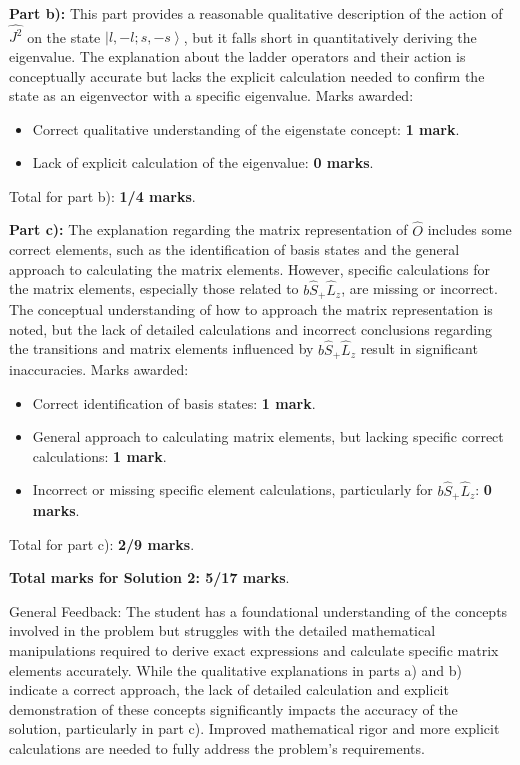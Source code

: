 \documentclass[a4paper,11pt]{article}
\begin{document}
\textbf{Part b):} This part provides a reasonable qualitative description of the action of \(\hat{J^{2}}\) on the state \(\left|l, -l; s, -s \right>\), but it falls short in quantitatively deriving the eigenvalue. The explanation about the ladder operators and their action is conceptually accurate but lacks the explicit calculation needed to confirm the state as an eigenvector with a specific eigenvalue. Marks awarded:
\begin{itemize}
    \item Correct qualitative understanding of the eigenstate concept: \textbf{1 mark}.
    \item Lack of explicit calculation of the eigenvalue: \textbf{0 marks}.
\end{itemize}
Total for part b): \textbf{1/4 marks}.

\textbf{Part c):} The explanation regarding the matrix representation of \(\hat{O}\) includes some correct elements, such as the identification of basis states and the general approach to calculating the matrix elements. However, specific calculations for the matrix elements, especially those related to \(b\hat{S}_{+}\hat{L}_{z}\), are missing or incorrect. The conceptual understanding of how to approach the matrix representation is noted, but the lack of detailed calculations and incorrect conclusions regarding the transitions and matrix elements influenced by \(b\hat{S}_{+}\hat{L}_{z}\) result in significant inaccuracies. Marks awarded:
\begin{itemize}
    \item Correct identification of basis states: \textbf{1 mark}.
    \item General approach to calculating matrix elements, but lacking specific correct calculations: \textbf{1 mark}.
    \item Incorrect or missing specific element calculations, particularly for \(b\hat{S}_{+}\hat{L}_{z}\): \textbf{0 marks}.
\end{itemize}
Total for part c): \textbf{2/9 marks}.

\textbf{Total marks for Solution 2: 5/17 marks}.

General Feedback: The student has a foundational understanding of the concepts involved in the problem but struggles with the detailed mathematical manipulations required to derive exact expressions and calculate specific matrix elements accurately. While the qualitative explanations in parts a) and b) indicate a correct approach, the lack of detailed calculation and explicit demonstration of these concepts significantly impacts the accuracy of the solution, particularly in part c). Improved mathematical rigor and more explicit calculations are needed to fully address the problem's requirements.
\end{document}
